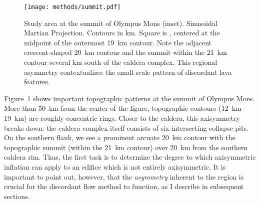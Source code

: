 \begin{figure}
    \centering
    \texttt{[image: methods/summit.pdf]}
    \caption[Summit study area]{Study area at the summit of Olympus Mons (inset). Sinusoidal Martian Projection. Contours in \unit{km}. Square is , centered at the midpoint of the outermost \qty{19}{\km} contour. Note the adjacent crescent-shaped \qty{20}{km} contour and the summit within the \qty{21}{km} contour several km south of the caldera complex. This regional asymmetry contextualizes the small-scale pattern of discordant lava features.}\label{fig:summit}
\end{figure}

Figure~\ref{fig:summit} shows important topographic patterns at the summit of Olympus Mons. More than \qty{50}{\km} from the center of the figure, topographic contours (\qtyrange{12}{19}{\km}) are roughly concentric rings. Closer to the caldera, this axisymmetry breaks down: the caldera complex itself consists of six intersecting collapse pits. On the southern flank, we see a prominent arcuate \qty{20}{\km} contour with the topographic summit (within the \qty{21}{\km} contour) over \qty{20}{\km} from the southern caldera rim. Thus, the first task is to determine the degree to which axisymmetric inflation can apply to an edifice which is not entirely axisymmetric. It is important to point out, however, that the \emph{asymmetry} inherent to the region is crucial for the discordant flow method to function, as I describe in subsequent sections. 
